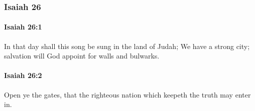 	\subsubsection{Isaiah 26} %
		\label{ISAIAH-26}

		\paragraph{Isaiah 26:1} %
			\label{ISAIAH-26-1}

			In that day shall this song be sung in the land of Judah; We have a strong city; salvation will God appoint for walls and bulwarks.


		\paragraph{Isaiah 26:2} %
			\label{ISAIAH-26-2}

			Open ye the gates, that the righteous nation which keepeth the truth may enter in.

